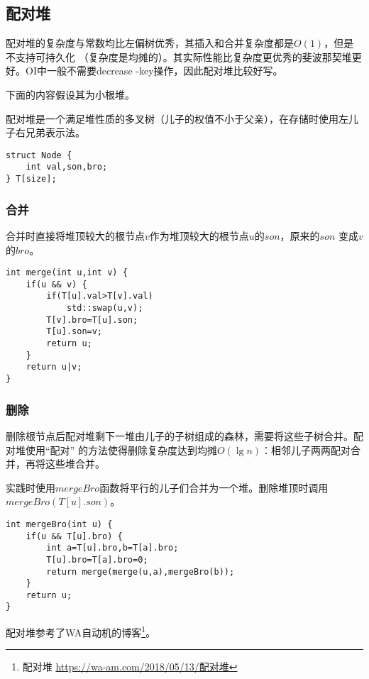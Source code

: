\subsection{配对堆}
配对堆的复杂度与常数均比左偏树优秀，其插入和合并复杂度都是$O(1)$，但是不支持可持久化
（复杂度是均摊的）。其实际性能比复杂度更优秀的斐波那契堆更好。OI中一般不需要decrease
-key操作，因此配对堆比较好写。

下面的内容假设其为小根堆。

配对堆是一个满足堆性质的多叉树（儿子的权值不小于父亲），在存储时使用左儿子右兄弟表示法。
\begin{lstlisting}
struct Node {
    int val,son,bro;
} T[size];
\end{lstlisting}
\subsubsection{合并}
合并时直接将堆顶较大的根节点$v$作为堆顶较大的根节点$u$的$son$，原来的$son$
变成$v$的$bro$。
\begin{lstlisting}
int merge(int u,int v) {
    if(u && v) {
        if(T[u].val>T[v].val)
            std::swap(u,v);
        T[v].bro=T[u].son;
        T[u].son=v;
        return u;
    }
    return u|v;
}
\end{lstlisting}
\subsubsection{删除}
删除根节点后配对堆剩下一堆由儿子的子树组成的森林，需要将这些子树合并。配对堆使用``配对''
的方法使得删除复杂度达到均摊$O(\lg n)$：相邻儿子两两配对合并，再将这些堆合并。

实践时使用$mergeBro$函数将平行的儿子们合并为一个堆。删除堆顶时调用$mergeBro(T[u].son)$。

\begin{lstlisting}
int mergeBro(int u) {
    if(u && T[u].bro) {
        int a=T[u].bro,b=T[a].bro;
        T[u].bro=T[a].bro=0;
        return merge(merge(u,a),mergeBro(b));
    }
    return u;
}
\end{lstlisting}

配对堆参考了WA自动机的博客\footnote{
    配对堆
    \url{https://wa-am.com/2018/05/13/配对堆}
}。
